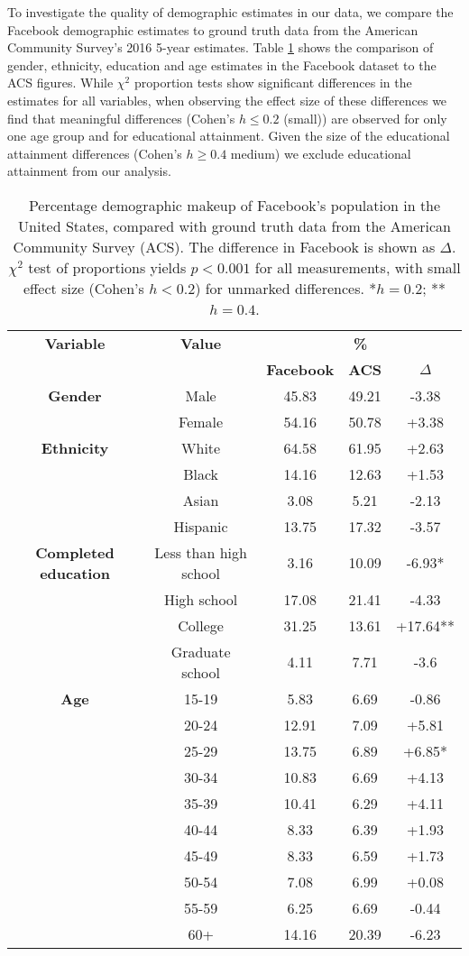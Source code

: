 To investigate the quality of demographic estimates in our data, we compare the Facebook demographic estimates to ground truth data from the American Community Survey's 2016 5-year estimates. Table \ref{tab:comparison} shows the comparison of gender, ethnicity, education and age estimates in the Facebook dataset to the ACS figures. While $\chi^2$ proportion tests show significant differences in the estimates for all variables, when observing the effect size of these differences we find that meaningful differences (Cohen's $h\le0.2$ (small)) are observed for only one age group and for educational attainment. Given the size of the educational attainment differences (Cohen's $h\ge0.4$ medium) we exclude educational attainment from our analysis. 

\begin{table}
\centering
\begin{tabular}{c | c | c | c | c} 
\toprule
\textbf{Variable} & \textbf{Value} & \multicolumn{3}{c}{\textbf{\%}}\\
& & \textbf{Facebook} & \textbf{ACS} & \textbf{$\Delta$}\\
 \hline
\textbf{Gender} & Male & 45.83 & 49.21 & -3.38\\
& Female & 54.16 & 50.78 & +3.38\\
 \midrule
 \textbf{Ethnicity} & White & 64.58 & 61.95 & +2.63\\
 & Black & 14.16 & 12.63 & +1.53\\
 & Asian & 3.08 & 5.21 & -2.13\\
 & Hispanic & 13.75 & 17.32 & -3.57\\
 \midrule
 \textbf{Completed education} & Less than high school & 3.16 & 10.09 & -6.93*\\
 & High school & 17.08 & 21.41 & -4.33\\
 & College & 31.25 & 13.61 & +17.64**\\
 & Graduate school & 4.11 & 7.71 & -3.6\\
 \midrule
 \textbf{Age} & 15-19 & 5.83 & 6.69 & -0.86\\
 & 20-24 & 12.91 & 7.09 & +5.81\\
 & 25-29 & 13.75 & 6.89 & +6.85*\\
 & 30-34 & 10.83 & 6.69 & +4.13\\
 & 35-39 & 10.41 & 6.29 & +4.11\\
 & 40-44 & 8.33 & 6.39 & +1.93\\
 & 45-49 & 8.33 & 6.59 & +1.73\\
 & 50-54 & 7.08 & 6.99 & +0.08\\
 & 55-59 & 6.25 & 6.69 & -0.44\\
 & 60+ & 14.16 & 20.39 & -6.23\\ 
 \bottomrule
\end{tabular}
\caption{Percentage demographic makeup of Facebook's population in the United States, compared with ground truth data from the American Community Survey (ACS). The difference in Facebook is shown as $\Delta$. $\chi^2$ test of proportions yields $p < 0.001$ for all measurements, with small effect size (Cohen's $h < 0.2$) for unmarked differences. *$h = 0.2$; **$h = 0.4$.}
\label{tab:comparison}
\end{table}

